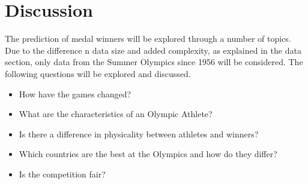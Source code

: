 \documentclass[a4 paper, 12pt]{article}
\begin{document}
\section{Discussion}
The prediction of medal winners will be explored through a number of topics. Due to the difference n data size and added complexity, as explained in the data section, only data from the Summer Olympics since 1956 will be considered. The following questions will be explored and discussed.
            \begin{itemize}
                \item How have the games changed?
                \item What are the characteristics of an Olympic Athlete?
                \item Is there a difference in physicality between athletes and winners?
                \item Which countries are the best at the Olympics and how do they differ?
                \item Is the competition fair?
            \end{itemize}
\end{document}
